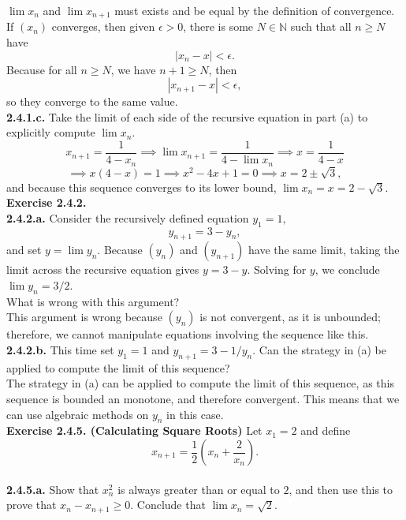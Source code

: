 \documentclass[12pt,letterpaper]{article}
\begin{document}
\(\lim x_{n}\) and \(\lim x_{n+1}\) must exists and be equal by the definition of convergence. If \((x_{n})\) converges, then given \(\epsilon > 0\), there is some \(N \in \mathbb{N}\) such that all \(n \geq N\) have \[|x_{n} - x| < \epsilon.\] Because for all \(n \geq N\), we have \(n+1 \geq N\), then \[|x_{n+1} - x| < \epsilon,\] so they converge to the same value. \\

\textbf{2.4.1.c.} Take the limit of each side of the recursive equation in part (a) to explicitly compute \(\lim x_{n}\). \\

\[x_{n+1} = \frac{1}{4-x_{n}} \implies \lim x_{n+1} = \frac{1}{4-\lim x_{n}} \implies x = \frac{1}{4-x}\]\[\implies x(4-x) = 1 \implies x^{2} - 4x + 1 = 0 \implies x = 2 \pm \sqrt{3},\] and because this sequence converges to its lower bound, \(\lim x_{n} = x = 2 - \sqrt{3}\). \\

\textbf{Exercise 2.4.2.} \\

\textbf{2.4.2.a.} Consider the recursively defined equation \(y_{1} = 1,\) \[y_{n+1} = 3-y_{n},\] and set \(y = \lim y_{n}\). Because \((y_{n})\) and \((y_{n+1})\) have the same limit, taking the limit across the recursive equation gives \(y = 3 - y.\) Solving for \(y\), we conclude \(\lim y_{n} = 3/2\). \\
What is wrong with this argument? \\

This argument is wrong because \((y_{n})\) is not convergent, as it is unbounded; therefore, we cannot manipulate equations involving the sequence like this. \\

\textbf{2.4.2.b.} This time set \(y_{1} = 1\) and \(y_{n+1} = 3 - 1/y_{n}\). Can the strategy in (a) be applied to compute the limit of this sequence? \\

The strategy in (a) can be applied to compute the limit of this sequence, as this sequence is bounded an monotone, and therefore convergent. This means that we can use algebraic methods on \(y_{n}\) in this case. \\

\textbf{Exercise 2.4.5. (Calculating Square Roots)} Let \(x_{1} = 2\) and define \[x_{n+1} = \frac{1}{2}\left(x_{n} + \frac{2}{x_{n}}\right).\] \\

\textbf{2.4.5.a.} Show that \(x_{n}^{2}\) is always greater than or equal to \(2\), and then use this to prove that \(x_{n} - x_{n+1} \geq 0\). Conclude that \(\lim x_{n} = \sqrt{2}\). \\
\end{document}
